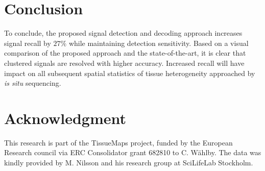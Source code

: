 \documentclass[10pt,journal]{IEEEtran}
\begin{document}



\section{Conclusion}
To conclude, the proposed signal detection and decoding approach increases signal recall by $27\%$ while maintaining detection sensitivity. Based on a visual comparison of the proposed approach and the state-of-the-art, it is clear that clustered signals are resolved with higher accuracy. Increased recall will have impact on all subsequent spatial statistics of tissue heterogeneity approached by \textit{is situ} sequencing.

\section*{Acknowledgment}
This research is part of the TissueMaps project, funded by the European Research council via ERC Consolidator grant 682810 to C. W{\"a}hlby. The data was kindly provided by M. Nilsson and his research group at SciLifeLab Stockholm.









\end{document}
